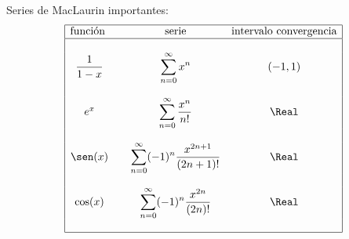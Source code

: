 \documentclass{article}
\begin{document}
Series de MacLaurin importantes:
$$\begin{array}{|cccc|}
  \hline
  \text{función } & & \text{serie} & \text{intervalo convergencia}\\
  \hline
  & & & \\
  \dfrac{1}{1-x} & & \displaystyle\sum_{n=0}^\infty x^n & (-1,1)\\
  & & & \\
  e^x & & \displaystyle\sum_{n=0}^\infty \frac{x^n}{n!} & \Real\\
  & & & \\
  \sen(x) & & \displaystyle\sum_{n=0}^\infty (-1)^n\frac{x^{2n+1}}{(2n+1)!} & \Real\\
  & & & \\
  \cos(x) & & \displaystyle\sum_{n=0}^\infty (-1)^n\frac{x^{2n}}{(2n)!} & \Real\\
  & & & \\
  \hline
\end{array}$$
\vspace{2mm}

\end{document}
